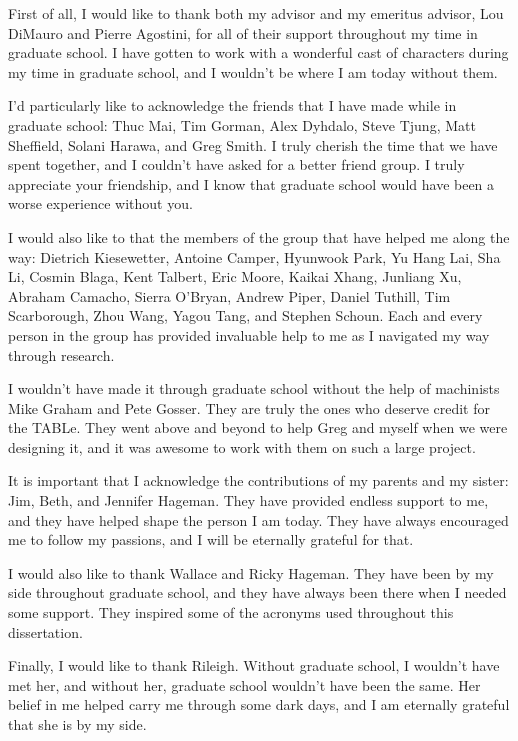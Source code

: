 \begin{acknowledgments}

First of all, I would like to thank both my advisor and my emeritus advisor, Lou DiMauro and Pierre Agostini, for all of their support throughout my time in graduate school. I have gotten to work with a wonderful cast of characters during my time in graduate school, and I wouldn't be where I am today without them.

I'd particularly like to acknowledge the friends that I have made while in graduate school: Thuc Mai, Tim Gorman, Alex Dyhdalo, Steve Tjung, Matt Sheffield, Solani Harawa, and Greg Smith.  I truly cherish the time that we have spent together, and I couldn't have asked for a better friend group.  I truly appreciate your friendship, and I know that graduate school would have been a worse experience without you.

I would also like to that the members of the group that have helped me along the way: Dietrich Kiesewetter, Antoine Camper, Hyunwook Park, Yu Hang Lai, Sha Li, Cosmin Blaga, Kent Talbert, Eric Moore, Kaikai Xhang, Junliang Xu, Abraham Camacho, Sierra O'Bryan, Andrew Piper, Daniel Tuthill, Tim Scarborough, Zhou Wang, Yagou Tang, and Stephen Schoun.  Each and every person in the group has provided invaluable help to me as I navigated my way through research.

I wouldn't have made it through graduate school without the help of machinists Mike Graham and Pete Gosser.  They are truly the ones who deserve credit for the TABLe.  They went above and beyond to help Greg and myself when we were designing it, and it was awesome to work with them on such a large project.

It is important that I acknowledge the contributions of my parents and my sister: Jim, Beth, and Jennifer Hageman.  They have provided endless support to me, and they have helped shape the person I am today.  They have always encouraged me to follow my passions, and I will be eternally grateful for that.

I would also like to thank Wallace and Ricky Hageman.  They have been by my side throughout graduate school, and they have always been there when I needed some support. They inspired some of the acronyms used throughout this dissertation.

Finally, I would like to thank Rileigh.  Without graduate school, I wouldn't have met her, and without her, graduate school wouldn't have been the same.  Her belief in me helped carry me through some dark days, and I am eternally grateful that she is by my side.




\end{acknowledgments}